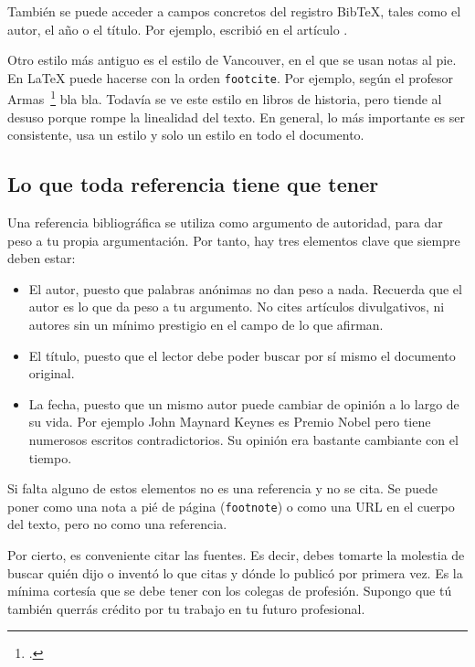 También se puede acceder a campos concretos del registro BibTeX, tales como el autor, el año o el título.  Por ejemplo, \citeauthor{armas2011estimation} escribió en \citeyear{armas2011estimation} el artículo .

Otro estilo más antiguo es el estilo de Vancouver, en el que se usan notas al pie.  En \LaTeX{} puede hacerse con la orden \texttt{footcite}.  Por ejemplo, según el profesor Armas~\footcite[3]{armas2011estimation} bla bla.  Todavía se ve este estilo en libros de historia, pero tiende al desuso porque rompe la linealidad del texto. En general, lo más importante es ser consistente, usa un estilo y solo un estilo en todo el documento.

\subsection{Lo que toda referencia tiene que tener}

Una referencia bibliográfica se utiliza como argumento de autoridad, para dar peso a tu propia argumentación.  Por tanto, hay tres elementos clave que siempre deben estar: 
\begin{itemize}
    \item El autor, puesto que palabras anónimas no dan peso a nada.  Recuerda que el autor es lo que da peso a tu argumento.  No cites artículos divulgativos, ni autores sin un mínimo prestigio en el campo de lo que afirman.
    \item El título, puesto que el lector debe poder buscar por sí mismo el documento original.
    \item La fecha, puesto que un mismo autor puede cambiar de opinión a lo largo de su vida.  Por ejemplo  John Maynard Keynes es Premio Nobel pero tiene numerosos escritos contradictorios.  Su opinión era bastante cambiante con el tiempo.
\end{itemize}

Si falta alguno de estos elementos no es una referencia y no se cita.  Se puede poner como una nota a pié de página (\texttt{footnote}) o como una URL en el cuerpo del texto, pero no como una referencia.

Por cierto, es conveniente citar las fuentes.  Es decir, debes tomarte la molestia de buscar quién dijo o inventó lo que citas y dónde lo publicó por primera vez.  Es la mínima cortesía que se debe tener con los colegas de profesión.  Supongo que tú también querrás crédito por tu trabajo en tu futuro profesional.
